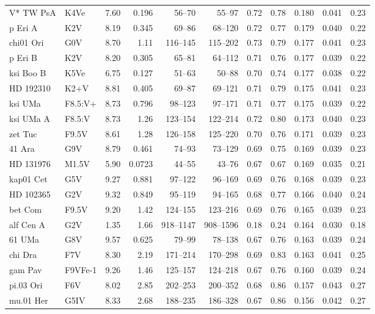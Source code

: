 \documentclass[11pt,a4paper]{article}
\begin{document}
{\begin{longtable}{llrrrrrrrrr}
V* TW PsA & K4Ve & 7.60 & 0.196 & 56--70 & 55--97 & 0.72 & 0.78 & 0.180 & 0.041 & 0.23 \\
p Eri A & K2V & 8.19 & 0.345 & 69--86 & 68--120 & 0.72 & 0.77 & 0.179 & 0.040 & 0.22 \\
chi01 Ori & G0V & 8.70 & 1.11 & 116--145 & 115--202 & 0.73 & 0.79 & 0.177 & 0.041 & 0.23 \\
p Eri B & K2V & 8.20 & 0.305 & 65--81 & 64--112 & 0.71 & 0.76 & 0.177 & 0.039 & 0.22 \\
ksi Boo B & K5Ve & 6.75 & 0.127 & 51--63 & 50--88 & 0.70 & 0.74 & 0.177 & 0.038 & 0.22 \\
HD 192310 & K2+V & 8.81 & 0.405 & 69--87 & 69--121 & 0.71 & 0.79 & 0.175 & 0.041 & 0.23 \\
ksi UMa & F8.5:V+ & 8.73 & 0.796 & 98--123 & 97--171 & 0.71 & 0.77 & 0.175 & 0.039 & 0.22 \\
ksi UMa A & F8.5:V & 8.73 & 1.26 & 123--154 & 122--214 & 0.72 & 0.80 & 0.173 & 0.040 & 0.23 \\
zet Tuc & F9.5V & 8.61 & 1.28 & 126--158 & 125--220 & 0.70 & 0.76 & 0.171 & 0.039 & 0.23 \\
41 Ara & G9V & 8.79 & 0.461 & 74--93 & 73--129 & 0.69 & 0.75 & 0.169 & 0.039 & 0.23 \\
HD 131976 & M1.5V & 5.90 & 0.0723 & 44--55 & 43--76 & 0.67 & 0.67 & 0.169 & 0.035 & 0.21 \\
kap01 Cet & G5V & 9.27 & 0.881 & 97--122 & 96--169 & 0.69 & 0.76 & 0.168 & 0.039 & 0.23 \\
HD 102365 & G2V & 9.32 & 0.849 & 95--119 & 94--165 & 0.68 & 0.77 & 0.166 & 0.040 & 0.24 \\
bet Com & F9.5V & 9.20 & 1.42 & 124--155 & 123--216 & 0.69 & 0.76 & 0.165 & 0.039 & 0.23 \\
alf Cen A & G2V & 1.35 & 1.66 & 918--1147 & 908--1596 & 0.18 & 0.24 & 0.164 & 0.030 & 0.18 \\
61 UMa & G8V & 9.57 & 0.625 & 79--99 & 78--138 & 0.67 & 0.76 & 0.163 & 0.039 & 0.24 \\
chi Dra & F7V & 8.30 & 2.19 & 171--214 & 170--298 & 0.69 & 0.83 & 0.163 & 0.041 & 0.25 \\
gam Pav & F9VFe-1 & 9.26 & 1.46 & 125--157 & 124--218 & 0.67 & 0.76 & 0.160 & 0.039 & 0.24 \\
pi.03 Ori & F6V & 8.02 & 2.85 & 202--253 & 200--352 & 0.68 & 0.86 & 0.157 & 0.043 & 0.27 \\
mu.01 Her & G5IV & 8.33 & 2.68 & 188--235 & 186--328 & 0.67 & 0.86 & 0.156 & 0.042 & 0.27 \\

\end{longtable}}
\end{document}
